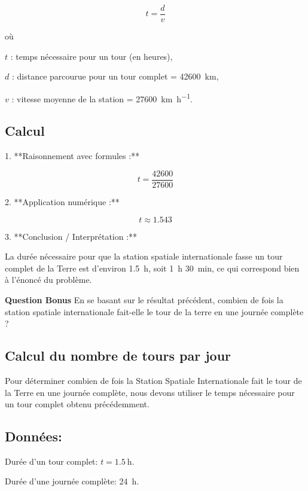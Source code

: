 \documentclass[answers]{exam}
\begin{document}
\begin{questions}
\begin{solution}
\[
t = \frac{d}{v}
\]

où 

\begin{addmargin}[4em]{1em}
  \begin{compactitem}
    \item [\(t\)] : temps nécessaire pour un tour (en heures),
    \item [\(d\)] : distance parcourue pour un tour complet = \SI{42600}{\kilo\meter},
    \item [\(v\)] : vitesse moyenne de la station = \SI{27600}{\kilo\meter\per\hour}.
  \end{compactitem}
\end{addmargin}

\subsection*{Calcul}

1. **Raisonnement avec formules :**

\[
t = \frac{42600}{27600}
\]

2. **Application numérique :**

\[
t \approx 1.543
\]

3. **Conclusion / Interprétation :**

La durée nécessaire pour que la station spatiale internationale fasse un tour complet de la Terre est d'environ \SI{1.5}{\hour}, soit \SI{1}{\hour} \SI{30}{\minute}, ce qui correspond bien à l'énoncé du problème. 

\end{solution}

\question[2] \textbf{Question Bonus} En se basant sur le résultat précédent, combien de fois la station spatiale internationale fait-elle le tour de la terre en une journée complète ?



\begin{solution}

\subsection*{Calcul du nombre de tours par jour}

Pour déterminer combien de fois la Station Spatiale Internationale fait le tour de la Terre en une journée complète, nous devons utiliser le temps nécessaire pour un tour complet obtenu précédemment.

\subsection*{Données:}
\begin{compactitem}
    \item Durée d'un tour complet: \( t = \SI{1.5}{\hour} \).
    \item Durée d'une journée complète: \SI{24}{\hour}.
\end{compactitem}


\end{solution}
\end{questions}
\end{document}
